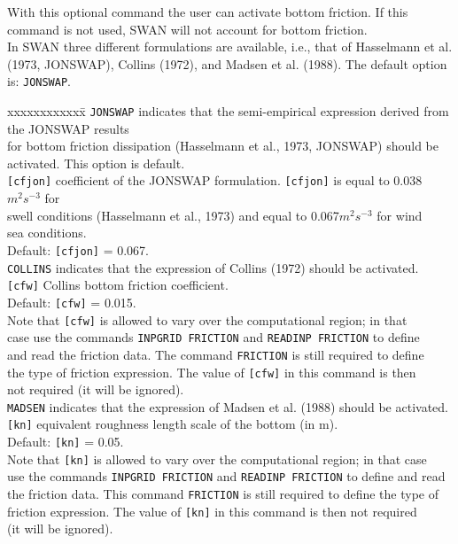 \documentclass[12pt]{book}
\begin{document}
\noindent
With this optional command the user can activate bottom friction. If this command is not used, SWAN will not account for bottom friction.
\\[2ex]
\noindent
In SWAN three different formulations are available, i.e., that of Hasselmann et al. (1973, JONSWAP),
Collins (1972), and Madsen et al. (1988). The default option is: {\tt JONSWAP}.
\begin{tabbing}
xxxxxxxxxxxx\= \kill
{\tt JONSWAP} \> indicates that the semi-empirical expression derived from the JONSWAP results\+\\
                 for bottom friction dissipation (Hasselmann et al., 1973, JONSWAP) should be\\
                 activated. This option is default.\-\\
{\tt [cfjon]} \> coefficient of the JONSWAP formulation. {\tt [cfjon]} is equal to 0.038$m^2 s^{-3}$ for\+\\
                 swell conditions (Hasselmann et al., 1973) and equal to 0.067$m^2 s^{-3}$ for wind\\
                 sea conditions.\\
                 Default: {\tt [cfjon]} = 0.067.\-\\
{\tt COLLINS} \> indicates that the expression of Collins (1972) should be activated.\\
{\tt [cfw]}   \> Collins bottom friction coefficient.\+\\
                 Default: {\tt [cfw]} = 0.015.\\
                 Note that {\tt [cfw]} is allowed to vary over the computational region; in that\\
                 case use the commands {\tt INPGRID FRICTION} and {\tt READINP FRICTION} to define\\
                 and read the friction data. The command {\tt FRICTION} is still required to define\\
                 the type of friction expression. The value of {\tt [cfw]} in this command is then\\
                 not required (it will be ignored).\-\\
{\tt MADSEN}  \> indicates that the expression of Madsen et al. (1988) should be activated.\\
{\tt [kn]}    \> equivalent roughness length scale of the bottom (in m).\+\\
                 Default: {\tt [kn]} = 0.05.\\
                 Note that {\tt [kn]} is allowed to vary over the computational region; in that case\\
                 use the commands {\tt INPGRID FRICTION} and {\tt READINP FRICTION} to define and read\\
                 the friction data. This command {\tt FRICTION} is still required to define the type of\\
                 friction expression. The value of {\tt [kn]} in this command is then not required\\
                 (it will be ignored).\-\\
\end{tabbing}
\end{document}
